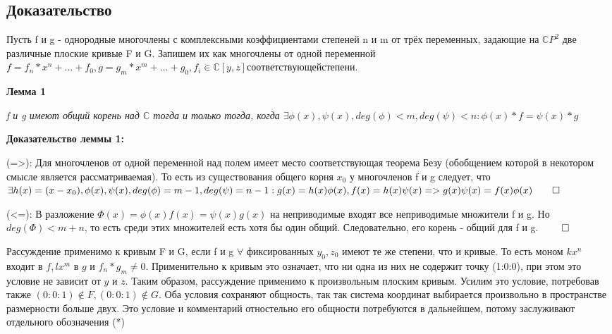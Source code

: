 \documentclass[a4paper, 12pt]{article}
\begin{document}
\subsection{Доказательство}
Пусть f и g - однородные многочлены с комплексными коэффициентами степеней n и m от трёх переменных, задающие на $\mathbb{C}P^2$ две различные плоские кривые F и G.
Запишем их как многочлены от одной переменной $f=f_n*x^n + ... + f_0, g=g_m*x^m + ... + g_0, f_i \in \mathbb{C}[y,z] соответствующей степени$.

\textbf{Лемма 1}

\textit{f и g имеют общий корень над $\mathbb{C}$ тогда и только тогда, когда $\exists \phi(x), \psi(x), deg(\phi) < m, deg(\psi) < n: \phi(x)*f = \psi(x)*g$}

\textbf{Доказательство леммы 1:}

(=>): Для многочленов от одной переменной над полем имеет место соответствующая теорема Безу (обобщением которой в некотором смысле является рассматриваемая). То есть из существования общего корня $x_0$ у многочленов f и g следует, что $\exists h(x)=(x-x_0), \phi(x), \psi(x), deg(\phi) = m-1, deg(\psi) = n-1: g(x)=h(x)\phi(x), f(x)=h(x)\psi(x) => g(x)\psi(x) = f(x)\phi(x) \qed$

(<=): В разложение $\Phi(x) = \phi(x)f(x) = \psi(x)g(x)$ на неприводимые входят все неприводимые множители f и g. Но $deg(\Phi) < m + n$, то есть среди этих множителей есть хотя бы один общий. Следовательно, его корень - общий для f и g. $\qed$

\bigskip
Рассуждение применимо к кривым F и G, если f и g $\forall$ фиксированных $y_0, z_0$ имеют те же степени, что и кривые. То есть моном $kx^n$ входит в $f, lx^m$ в $g$ и $f_n*g_m \neq 0$. Применительно к кривым это означает, что ни одна из них не содержит точку (1:0:0), при этом это условие не зависит от $y$ и $z$. Таким образом, рассуждение применимо к произвольным плоским кривым. Усилим это условие, потребовав также $(0:0:1) \notin F, (0:0:1) \notin G$. Оба условия сохраняют общность, так так система координат выбирается произвольно в пространстве размерности больше двух. Это условие и комментарий отностельно его общности потребуются в дальнейшем, потому заслуживают отдельного обозначения (*) %
\bigskip
\end{document}
